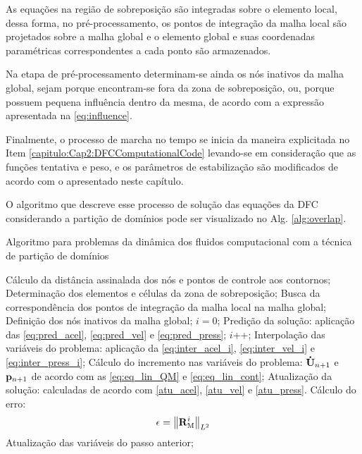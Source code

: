 As equações na região de sobreposição são integradas sobre o elemento local, dessa forma, no pré-processamento, os pontos de integração da malha local são projetados sobre a malha global e o elemento global e suas coordenadas paramétricas correspondentes a cada ponto são armazenados. 

Na etapa de pré-processamento determinam-se ainda os nós inativos da malha global, sejam porque encontram-se fora da zona de sobreposição, ou, porque possuem pequena influência dentro da mesma, de acordo com a expressão apresentada na \autoref{eq:influence}.

Finalmente, o processo de marcha no tempo se inicia da maneira explicitada no Item \ref{capitulo:Cap2:DFCComputationalCode} levando-se em consideração que as funções tentativa e peso, e os parâmetros de estabilização são modificados de acordo com o apresentado neste capítulo.

O algoritmo que descreve esse processo de solução das equações da DFC considerando a partição de domínios pode ser visualizado no Alg. \ref{alg:overlap}.

\begin{algorithm}
	\caption{Algoritmo para problemas da dinâmica dos fluidos computacional com a técnica de partição de domínios}
	\label{alg:overlap}
	\begin{algorithmic}[1]
		\State Cálculo da distância assinalada dos nós e pontos de controle aos contornos;
		\State Determinação dos elementos e células da zona de sobreposição;
		\State Busca da correspondência dos pontos de integração da malha local na malha global;
		\State Definição dos nós inativos da malha global;
		\State $i=0$;
		\State Predição da solução: aplicação das \autoref{eq:pred_acel}, \autoref{eq:pred_vel} e \autoref{eq:pred_press};
		\State $i$++;
		\State Interpolação das variáveis do problema: aplicação da \autoref{eq:inter_acel_i}, \autoref {eq:inter_vel_i} e \autoref{eq:inter_press_i};
		\State Cálculo do incremento nas variáveis do problema: $\mathbf{\dot{U}}_{n+1}$ e $\mathbf{p}_{n+1}$ de acordo com as \autoref{eq:eq_lin_QM} e \autoref{eq:eq_lin_cont};
		\State Atualização da solução: calculadas de acordo com \autoref{atu_acel}, \autoref{atu_vel} e \autoref{atu_press}.
		\State Cálculo do erro:
		\begin{align}
			\epsilon =\left\| \mathbf{R}_\mathrm{M}^i \right\|_{L^2}
		\end{align}
		\EndWhile
		\State Atualização das variáveis do passo anterior;
		\EndFor
	\end{algorithmic}
\end{algorithm}

